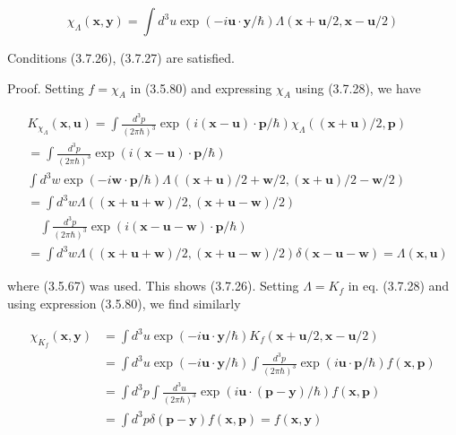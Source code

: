 \documentclass{article}
\begin{document}
\begin{equation*}
\chi_{\Lambda}(\boldsymbol{x}, \boldsymbol{y})=\int d^{3} u \exp (-i \boldsymbol{u} \cdot \boldsymbol{y} / \hbar) \Lambda(\boldsymbol{x}+\boldsymbol{u} / 2, \boldsymbol{x}-\boldsymbol{u} / 2) \tag{3.7.28}
\end{equation*}
 

Conditions (3.7.26), (3.7.27) are satisfied.

Proof. Setting $f=\chi_{A}$ in (3.5.80) and expressing $\chi_{A}$ using (3.7.28), we have
 
\begin{align*}
& K_{\chi_{\Lambda}}(\boldsymbol{x}, \boldsymbol{u})= \int \frac{d^{3} p}{(2 \pi \hbar)^{3}} \exp (i(\boldsymbol{x}-\boldsymbol{u}) \cdot \boldsymbol{p} / \hbar) \chi_{\Lambda}((\boldsymbol{x}+\boldsymbol{u}) / 2, \boldsymbol{p})  \tag{3.7.29}\\
&= \int \frac{d^{3} p}{(2 \pi \hbar)^{3}} \exp (i(\boldsymbol{x}-\boldsymbol{u}) \cdot \boldsymbol{p} / \hbar) \\
& \int d^{3} w \exp (-i \boldsymbol{w} \cdot \boldsymbol{p} / \hbar) \Lambda((\boldsymbol{x}+\boldsymbol{u}) / 2+\boldsymbol{w} / 2,(\boldsymbol{x}+\boldsymbol{u}) / 2-\boldsymbol{w} / 2) \\
&= \int d^{3} w \Lambda((\boldsymbol{x}+\boldsymbol{u}+\boldsymbol{w}) / 2,(\boldsymbol{x}+\boldsymbol{u}-\boldsymbol{w}) / 2) \\
& \quad \int \frac{d^{3} p}{(2 \pi \hbar)^{3}} \exp (i(\boldsymbol{x}-\boldsymbol{u}-\boldsymbol{w}) \cdot \boldsymbol{p} / \hbar) \\
&= \int d^{3} w \Lambda((\boldsymbol{x}+\boldsymbol{u}+\boldsymbol{w}) / 2,(\boldsymbol{x}+\boldsymbol{u}-\boldsymbol{w}) / 2) \delta(\boldsymbol{x}-\boldsymbol{u}-\boldsymbol{w})=\Lambda(\boldsymbol{x}, \boldsymbol{u})
\end{align*}
 
where (3.5.67) was used. This shows (3.7.26).
Setting $\Lambda=K_{f}$ in eq. (3.7.28) and using expression (3.5.80), we find similarly
 
\begin{align*}
\chi_{K_{f}}(\boldsymbol{x}, \boldsymbol{y}) & =\int d^{3} u \exp (-i \boldsymbol{u} \cdot \boldsymbol{y} / \hbar) K_{f}(\boldsymbol{x}+\boldsymbol{u} / 2, \boldsymbol{x}-\boldsymbol{u} / 2)  \tag{3.7.30}\\
& =\int d^{3} u \exp (-i \boldsymbol{u} \cdot \boldsymbol{y} / \hbar) \int \frac{d^{3} p}{(2 \pi \hbar)^{3}} \exp (i \boldsymbol{u} \cdot \boldsymbol{p} / \hbar) f(\boldsymbol{x}, \boldsymbol{p}) \\
& =\int d^{3} p \int \frac{d^{3} u}{(2 \pi \hbar)^{3}} \exp (i \boldsymbol{u} \cdot(\boldsymbol{p}-\boldsymbol{y}) / \hbar) f(\boldsymbol{x}, \boldsymbol{p}) \\
& =\int d^{3} p \delta(\boldsymbol{p}-\boldsymbol{y}) f(\boldsymbol{x}, \boldsymbol{p})=f(\boldsymbol{x}, \boldsymbol{y})
\end{align*}
 
\end{document}
